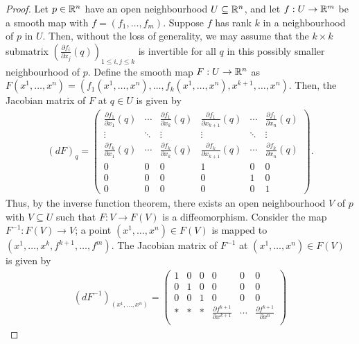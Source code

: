 \begin{proof}
    Let $p \in \mathbb{R}^{n}$ have an open neighbourhood $U \subseteq \mathbb{R}^{n}$, and let $f:U \to \mathbb{R}^{m}$ be a smooth map with $f = (f_{1},\ldots,f_{m})$. Suppose $f$ has rank $k$ in a neighbourhood of $p$ in $U$. Then, without the loss of generality, we may assume that the $k \times k$ submatrix $\left(\frac{\partial f_{i}}{\partial x_{j}}(q)\right)_{1 \leq i,j \leq k}$ is invertible for all $q$ in this possibly smaller neighbourhood of $p$. Define the smooth map $F:U \to \mathbb{R}^{n}$ as $F(x^{1},\ldots,x^{n}) = (f_{1}(x^{1},\ldots,x^{n}),\ldots,f_{k}(x^{1},\ldots,x^{n}),x^{k+1},\ldots,x^{n})$. Then, the Jacobian matrix of $F$ at $q \in U$ is given by
    \begin{align}
        (dF)_{q} = \begin{pmatrix}
            \frac{\partial f_{1}}{\partial x_{1}}(q) & \cdots & \frac{\partial f_{1}}{\partial x_{k}}(q) & \frac{\partial f_{1}}{\partial x_{k+1}}(q) & \cdots & \frac{\partial f_{1}}{\partial x_{n}}(q) \\
            \vdots & \ddots & \vdots & \vdots & \ddots & \vdots \\
            \frac{\partial f_{k}}{\partial x_{1}}(q) & \cdots & \frac{\partial f_{k}}{\partial x_{k}}(q) & \frac{\partial f_{k}}{\partial x_{k+1}}(q) & \cdots & \frac{\partial f_{k}}{\partial x_{n}}(q) \\
            0 & 0 & 0 & 1 & 0 & 0\\
            0 & 0 & 0 & 0 & 1 & 0\\
            0 & 0 & 0 & 0 & 0 & 1
        \end{pmatrix}.
    \end{align}
    Thus, by the inverse function theorem, there exists an open neighbourhood $V$ of $p$ with $V \subseteq U$ such that $F:V \to F(V)$ is a diffeomorphism. Consider the map $F^{-1}:F(V) \to V$; a point $(x^{1},\ldots,x^{n}) \in F(V)$ is mapped to $(x^{1},\ldots,x^{k},f^{k+1},\ldots,f^{m})$. The Jacobian matrix of $F^{-1}$ at $(x^{1},\ldots,x^{n}) \in F(V)$ is given by
    \begin{align}
        (dF^{-1})_{(x^{1},\ldots,x^{n})} = \begin{pmatrix}
            1 & 0 & 0 & 0 & 0 & 0 \\
            0 & 1 & 0 & 0 & 0 & 0 \\
            0 & 0 & 1 & 0 & 0 & 0 \\
            \ast & \ast & \ast & \frac{\partial f^{k+1}}{\partial x^{k+1}} & \cdots & \frac{\partial f^{k+1}}{\partial x^{n}} \\

\end{pmatrix}
\end{align}
\end{proof}
